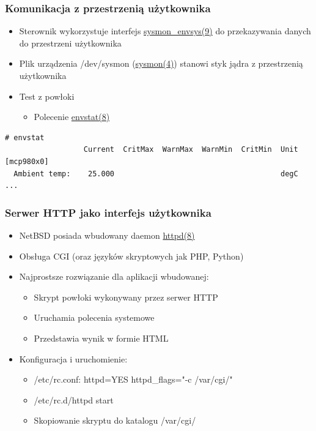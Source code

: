 \documentclass[dvipsnames,table]{beamer}
\begin{document}
\begin{frame}[fragile]
\frametitle{Komunikacja z przestrzenią użytkownika}
\begin{itemize}
	\item Sterownik wykorzystuje interfejs \href{http://netbsd.gw.com/cgi-bin/man-cgi?sysmon_envsys+9+NetBSD-current}{sysmon\_envsys(9)} do przekazywania danych do przestrzeni użytkownika
	\item Plik urządzenia /dev/sysmon (\href{http://netbsd.gw.com/cgi-bin/man-cgi?sysmon+4+NetBSD-current}{sysmon(4)}) stanowi styk jądra z przestrzenią użytkownika
	\item Test z powłoki
	\begin{itemize}
		\item Polecenie \href{http://netbsd.gw.com/cgi-bin/man-cgi?envstat+8+NetBSD-current}{envstat(8)}
	\end{itemize}
\end{itemize}
\scriptsize
\begin{verbatim}
# envstat
                  Current  CritMax  WarnMax  WarnMin  CritMin  Unit
[mcp980x0]
  Ambient temp:    25.000                                      degC
...
\end{verbatim}
\end{frame}


\begin{frame}[fragile]
\frametitle{Serwer HTTP jako interfejs użytkownika}
\begin{itemize}
	\item NetBSD posiada wbudowany daemon \href{http://netbsd.gw.com/cgi-bin/man-cgi?httpd++NetBSD-current}{httpd(8)}
	\item Obsługa CGI (oraz języków skryptowych jak PHP, Python)	
	\item Najprostsze rozwiązanie dla aplikacji wbudowanej:
	\begin{itemize}
		\item Skrypt powłoki wykonywany przez serwer HTTP
		\item Uruchamia polecenia systemowe
		\item Przedstawia wynik w formie HTML
	\end{itemize}
	\item Konfiguracja i uruchomienie:
	\begin{itemize}
		\item /etc/rc.conf: httpd=YES httpd\_flags="-c /var/cgi/"
		\item /etc/rc.d/httpd start
		\item Skopiowanie skryptu do katalogu /var/cgi/
	\end{itemize}

\end{itemize}
\lstCGI
\end{frame}
\end{document}
